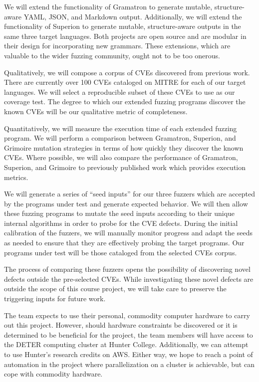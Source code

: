 \documentclass[12pt]{diazessay}
\begin{document}
We will extend the functionality of Gramatron to generate mutable, structure-aware YAML, JSON, and Markdown output.
Additionally, we will extend the functionality of Superion to generate mutable, structure-aware outputs in the same three target languages.
Both projects are open source and are modular in their design for incorporating new grammars.
These extensions, which are valuable to the wider fuzzing community, ought not to be too onerous.

Qualitatively, we will compose a corpus of CVEs discovered from previous work.
There are currently over 100 CVEs cataloged on MITRE\cite{MITRE} for each of our target languages.
We will select a reproducible subset of these CVEs to use as our coverage test.
The degree to which our extended fuzzing programs discover the known CVEs will be our qualitative metric of completeness.

\clearpage

Quantitatively, we will measure the execution time of each extended fuzzing program.
We will perform a comparison between Gramatron, Superion, and Grimoire mutation strategies in terms of how quickly they discover the known CVEs.
Where possible, we will also compare the performance of Gramatron, Superion, and Grimoire to previously published work which provides execution metrics.

We will generate a series of ``seed inputs'' for our three fuzzers which are accepted by the programs under test and generate expected behavior.
We will then allow these fuzzing programs to mutate the seed inputs\cite{Seed} according to their unique internal algorithms in order to probe for the CVE defects.
During the initial calibration of the fuzzers, we will manually monitor progress and adapt the seeds as needed to ensure that they are effectively probing the target programs.
Our programs under test will be those cataloged from the selected CVEs corpus.

The process of comparing these fuzzers opens the possibility of discovering novel defects outside the pre-selected CVEs.
While investigating these novel defects are outside the scope of this course project, we will take care to preserve the triggering inputs for future work.

The team expects to use their personal, commodity computer hardware to carry out this project.
However, should hardware constraints be discovered or it is determined to be beneficial for the project, the team members will have access to the DETER computing cluster at Hunter College.
Additionally, we can attempt to use Hunter's research credits on AWS.
Either way, we hope to reach a point of automation in the project where parallelization on a cluster is achievable, but can cope with commodity hardware.
\end{document}
